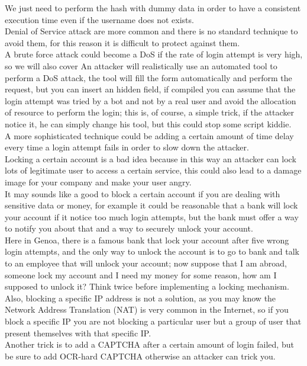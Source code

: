 We just need to perform the hash with dummy data in order to have a consistent execution time even if the username does not exists.\\
Denial of Service attack are more common and there is no standard technique to avoid them, for this reason it is difficult to protect against them.\\
A brute force attack could become a DoS if the rate of login attempt is very high, so we will also cover 
An attacker will realistically use an automated tool to perform a DoS attack, the tool will fill the form automatically and perform the request, but you can insert an hidden field, if compiled you can assume that the login attempt was tried by a bot and not by a real user and avoid the allocation of resource to perform the login; this is, of course, a simple trick, if the attacker notice it, he can simply change his tool, but this could stop some script kiddie.\\
A more sophisticated technique could be adding a certain amount of time delay every time a login attempt fails in order to slow down the attacker.\\
Locking a certain account is a bad idea because in this way an attacker can lock lots of legitimate user to access a certain service, this could also lead to a damage image for your company and make your user angry.\\
It may sounds like a good to block a certain account if you are dealing with sensitive data or money, for example it could be reasonable that a bank will lock your account if it notice too much login attempts, but the bank must offer a way to notify you about that and a way to securely unlock your account.\\
Here in Genoa, there is a famous bank that lock your account after five wrong login attempts, and the only way to unlock the account is to go to bank and talk to an employee that will unlock your account; now suppose that I am abroad, someone lock my account and I need my money for some reason, how am I supposed to unlock it?
Think twice before implementing a locking mechanism. \\

Also, blocking a specific IP address is not a solution, as you may know the Network Address Translation (NAT) is very common in the Internet, so if you block a specific IP you are not blocking a particular user but a group of user that present themselves with that specific IP.\\
Another trick is to add a CAPTCHA after a certain amount of login failed, but be sure to add OCR-hard CAPTCHA otherwise an attacker can trick you.\\

